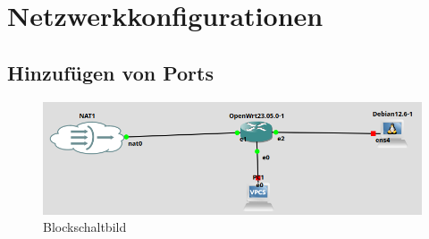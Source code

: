 \section{Netzwerkkonfigurationen}
\subsection{Hinzufügen von Ports}
\begin{figure} [!ht]
	\center
	\includegraphics[width=\textwidth]{images/GNS3/main1.png}
	\caption{Blockschaltbild}
\end{figure}